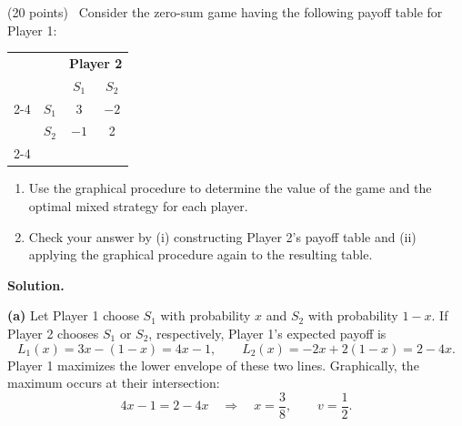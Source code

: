 \documentclass[11pt,letterpaper]{article}
\newenvironment{examquestion}[2]{%
  \clearpage
  \begin{list}{}{%
    \setlength{\leftmargin}{2.15em}%
    \setlength{\labelwidth}{1.55em}%
    \setlength{\labelsep}{0.60em}%
    \setlength{\itemindent}{0pt}%
    \setlength{\listparindent}{0pt}%
    \setlength{\parsep}{0.42em}%
    \setlength{\topsep}{0pt}%
  }
  \item[\hfill #1.] (#2 points)\ 
}{%
  \end{list}
}
\newenvironment{solution}{%
  \par\medskip
  \color{red}
  \noindent\textbf{Solution.}\par
}{%
  \par
  \color{black}
}
\newcommand{\Prob}{\mathbb{P}}
\begin{document}
\begin{examquestion}{1}{20}
Consider the zero-sum game having the following payoff table for Player 1:

\begin{center}
\begin{tabular}{cc|cc}
&&\multicolumn{2}{c}{\textbf{Player 2}}\\
&&$S_1$&$S_2$\\ \cline{2-4}
\multirow{2}{*}{\textbf{Player 1}}&$S_1$&3&$-2$\\
&$S_2$&$-1$&2\\ \cline{2-4}
\end{tabular}
\end{center}

\begin{enumerate}[label=(\alph*),leftmargin=2.2em]
  \item Use the graphical procedure to determine the value of the game and the
  optimal mixed strategy for each player.
  \item Check your answer by (i) constructing Player 2's payoff table and
  (ii) applying the graphical procedure again to the resulting table.
\end{enumerate}

\begin{solution}
\textbf{(a)} Let Player 1 choose $S_1$ with probability $x$ and $S_2$ with
probability $1-x$. If Player 2 chooses $S_1$ or $S_2$, respectively, Player 1's
expected payoff is
\[
L_1(x)=3x-(1-x)=4x-1,
\qquad
L_2(x)=-2x+2(1-x)=2-4x.
\]
Player 1 maximizes the lower envelope of these two lines. Graphically, the maximum
occurs at their intersection:
\[
4x-1=2-4x
\quad\Longrightarrow\quad
x=\frac38,
\qquad
v=\frac12.
\]

\begin{center}
\end{center}


\end{solution}
\end{examquestion}
\end{document}
